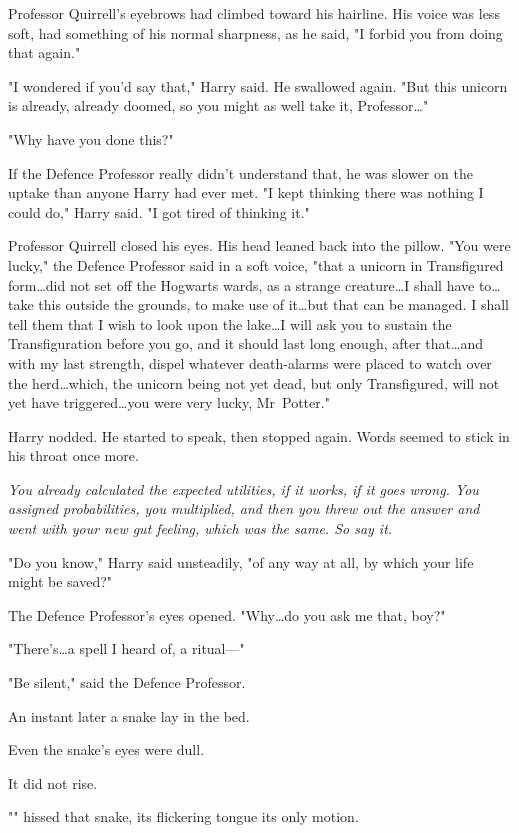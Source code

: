 Professor Quirrell's eyebrows had climbed toward his hairline. His voice was
less soft, had something of his normal sharpness, as he said, "I forbid you
from doing that again."

"I wondered if you'd say that," Harry said. He swallowed again. "But this
unicorn is already, already doomed, so you might as well take it,
Professor…"

"Why have you done this?"

If the Defence Professor really didn't understand that, he was slower on the
uptake than anyone Harry had ever met. "I kept thinking there was nothing I
could do," Harry said. "I got tired of thinking it."

Professor Quirrell closed his eyes. His head leaned back into the pillow. "You
were lucky," the Defence Professor said in a soft voice, "that a unicorn in
Transfigured form…did not set off the Hogwarts wards, as a strange
creature…I shall have to…take this outside the grounds, to make
use of it…but that can be managed. I shall tell them that I wish to
look upon the lake…I will ask you to sustain the Transfiguration before
you go, and it should last long enough, after that…and with my last
strength, dispel whatever death-alarms were placed to watch over the
herd…which, the unicorn being not yet dead, but only Transfigured, will
not yet have triggered…you were very lucky, Mr~Potter."

Harry nodded. He started to speak, then stopped again. Words seemed to stick in
his throat once more.

\emph{You already calculated the expected utilities, if it works, if it goes
wrong. You assigned probabilities, you multiplied, and then you threw out the
answer and went with your new gut feeling, which was the same. So say it.}

"Do you know," Harry said unsteadily, "of any way at all, by which your life
might be saved?"

The Defence Professor's eyes opened. "Why…do you ask me that, boy?"

"There's…a spell I heard of, a ritual—"

"Be silent," said the Defence Professor.

An instant later a snake lay in the bed.

Even the snake's eyes were dull.

It did not rise.

"" hissed that snake, its flickering tongue its only motion.


